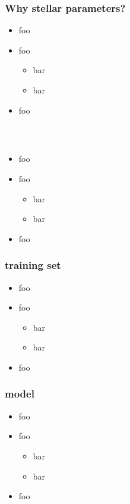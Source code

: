 \documentclass[pdftex]{beamer}
\begin{document}
\begin{frame}
  \frametitle{Why stellar parameters?}
  \begin{itemize}
  \item foo
  \item foo
    \begin{itemize}
    \item bar
    \item bar
    \end{itemize}
  \item foo
  \end{itemize}
\end{frame}

\begin{frame}
  \frametitle{\sdssiii\ \apogee}
  \begin{itemize}
  \item foo
  \item foo
    \begin{itemize}
    \item bar
    \item bar
    \end{itemize}
  \item foo
  \end{itemize}
\end{frame}

\begin{frame}
  \frametitle{training set}
  \begin{itemize}
  \item foo
  \item foo
    \begin{itemize}
    \item bar
    \item bar
    \end{itemize}
  \item foo
  \end{itemize}
\end{frame}

\begin{frame}
  \frametitle{model}
  \begin{itemize}
  \item foo
  \item foo
    \begin{itemize}
    \item bar
    \item bar
    \end{itemize}
  \item foo
  \end{itemize}
\end{frame}
\end{document}
